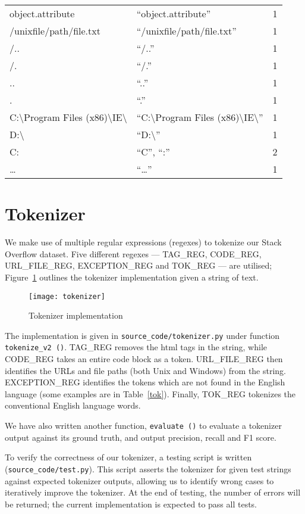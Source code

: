 \begin{table}
\begin{tabu}{X[5,l]X[5,l]X[2,l]}
    object.attribute & ``object.attribute'' & 1 \\
    /unixfile/path/file.txt & ``/unixfile/path/file.txt'' & 1 \\
    /.. & ``/..'' & 1 \\
    /. & ``/.'' & 1 \\
    .. & ``..'' & 1 \\
    . & ``.'' & 1 \\
    C:\textbackslash{}Program Files (x86)\textbackslash{}IE\textbackslash{}
    & ``C:\textbackslash{}Program Files (x86)\textbackslash{}IE\textbackslash{}''
    & 1 \\
    D:\textbackslash{} & ``D:\textbackslash{}'' & 1 \\
    C\@: & ``C'', ``:'' & 2 \\
    \ldots & ``\ldots'' & 1 \\
\end{tabu}
\end{table}
\twocolumn

\section{Tokenizer}

We make use of multiple regular expressions (regexes) to tokenize our Stack
Overflow dataset. Five different regexes --- TAG\_REG, CODE\_REG, URL\_FILE\_REG,
EXCEPTION\_REG and TOK\_REG --- are utilised; Figure~\ref{img:tok} outlines the
tokenizer implementation given a string of text.

\begin{figure}[h]
\texttt{[image: tokenizer]}
\caption{Tokenizer implementation}\label{img:tok}
\end{figure}

The implementation is given in \texttt{source\_code/tokenizer.py} under function
\texttt{tokenize\_v2\,()}.
TAG\_REG removes the html tags in the string, while CODE\_REG takes an entire code
block as a token. URL\_FILE\_REG then identifies the URLs and file paths (both Unix
and Windows) from the string. EXCEPTION\_REG identifies the tokens which are not
found in the English language (some examples are in Table~\ref{tok}). Finally,
TOK\_REG tokenizes the conventional English language words.

We have also written another function, \texttt{evaluate\,()} to evaluate
a tokenizer output against its ground truth, and output precision, recall and
F1 score.

To verify the correctness of our tokenizer, a testing script is written
(\texttt{source\_code/test.py}). This
script asserts the tokenizer for given test strings against expected tokenizer
outputs, allowing us to identify wrong cases to iteratively improve the tokenizer.
At the end of testing, the number of errors will be returned; the current
implementation is expected to pass all tests.

